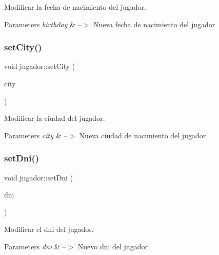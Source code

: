 Modificar la fecha de nacimiento del jugador. 


\begin{DoxyParams}{Parameters}
{\em birthday} & --$>$ Nueva fecha de nacimiento del jugador \\
\hline
\end{DoxyParams}
\mbox{\label{classjugador_ae00869eb01324db252abe1b2df0032bc}} 
\subsubsection{\texorpdfstring{set\+City()}{setCity()}}
{\footnotesize\ttfamily void jugador\+::set\+City (\begin{DoxyParamCaption}\item[{Q\+String}]{city }\end{DoxyParamCaption})}



Modificar la ciudad del jugador. 


\begin{DoxyParams}{Parameters}
{\em city} & --$>$ Nueva ciudad de nacimiento del jugador \\
\hline
\end{DoxyParams}
\mbox{\label{classjugador_a442a923a8704d783a9b0b7ce917a7e39}} 
\subsubsection{\texorpdfstring{set\+Dni()}{setDni()}}
{\footnotesize\ttfamily void jugador\+::set\+Dni (\begin{DoxyParamCaption}\item[{Q\+String}]{dni }\end{DoxyParamCaption})}



Modificar el dni del jugador. 


\begin{DoxyParams}{Parameters}
{\em dni} & --$>$ Nuevo dni del jugador \\
\hline
\end{DoxyParams}
\mbox{\label{classjugador_a75f1d73c24c859503450958bbf1d48ea}} 
